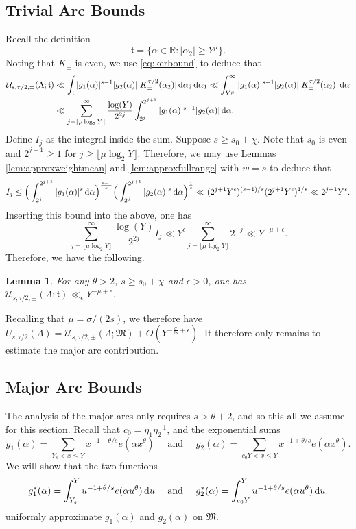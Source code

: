 \documentclass[11pt,reqno]{amsart}
\numberwithin{equation}{section}
\newtheorem{lemma}{Lemma}[section]
\renewcommand{\d}{\,{\rm d}}
\begin{document}
\subsection{Trivial Arc Bounds}
Recall the definition 
\[ \mathfrak{t} = \{ \alpha \in \mathbb{R}: |\alpha_2| \geq Y^{\mu} \} .\] 
Noting that $K_{\pm}$ is even, we use \eqref{eq:kerbound} to deduce that 
\begin{align*} \mathcal{U}_{s,\tau/2,\pm}(\Lambda; \mathfrak{t}) & \ll  \int_{\mathfrak{t}} |g_1(\alpha)|^{s-1}|g_2(\alpha)||K^{\tau/2}_{\pm}(\alpha_2)| \d\alpha_2\d\alpha_1 \ll  \int_{ Y^{\mu}}^{\infty} |g_1(\alpha)|^{s-1}|g_2(\alpha)||K^{\tau/2}_{\pm}(\alpha_2)|\d\alpha 
\\
& \ll \sum_{j = \lfloor{\mu \log_2 Y \rfloor} }^{\infty} \frac{\log(Y)}{2^{2j}}\int_{2^j}^{2^{j+1}} |g_1(\alpha)|^{s-1}|g_2(\alpha)|\d\alpha . 
\end{align*}
Define $I_j$ as the integral inside the sum. Suppose $s \geq s_0 +\chi $. Note that $s_0$ is even and $2^{j+1} \geq 1$ for $j \geq \lfloor \mu \log_2 Y \rfloor$. Therefore, we may use Lemmas \ref{lem:approxweightmean} and \ref{lem:approxfullrange} with $w = s$ to deduce that 
\[ I_j  \leq \Big( \int_{2^j}^{2^{j+1}} |g_1(\alpha)|^{s}\d\alpha \Big)^{\frac{s-1}{s}}\Big( \int_{2^j}^{2^{j+1}} |g_2(\alpha)|^{s}\d\alpha \Big)^{\frac{1}{s}} \ll (2^{j+1}Y^{\epsilon})^{(s-1)/s}(2^{j+1}Y^{\epsilon})^{1/s} \ll 2^{j+1}Y^{\epsilon}. \]
Inserting this bound into the above, one has 
\[ \sum_{j = \lfloor{\mu \log_2 Y \rfloor} }^{\infty} \frac{\log(Y)}{2^{2j}} I_j \ll Y^{\epsilon}\sum_{j=\lfloor{\mu \log_2 Y \rfloor}}^{\infty} 2^{-j} \ll Y^{-\mu+\epsilon}. \]
Therefore, we have the following. 
\begin{lemma} \label{lem:trivial} 
For any $\theta > 2$, $s \geq s_0+\chi$ and $\epsilon > 0$, one has $\mathcal{U}_{s,\tau/2,\pm}(\Lambda; \mathfrak{t}) \ll_{\epsilon} Y^{-\mu+\epsilon}$.
\end{lemma}
Recalling that $\mu = \sigma/(2s)$, we therefore have $U_{s,\tau/2}(\Lambda) = \mathcal{U}_{s,\tau/2,\pm}(\Lambda;\mathfrak{M})+O(Y^{-\frac{\sigma}{2s}+\epsilon})$. It therefore only remains to estimate the major arc contribution. 



\subsection{Major Arc Bounds} The analysis of the major arcs only requires $s > \theta +2$, and so this all we assume for this section. Recall that $c_0 = \eta_1\eta_2^{-1}$, and the exponential sums 
\[ g_1(\alpha) = \sum_{Y_s < x \leq Y} x^{-1+\theta/s}e(\alpha x^{\theta}) \quad \text{ and } \quad g_2(\alpha) = \sum_{c_0 Y < x \leq Y } x^{-1+\theta/s}e(\alpha x^{\theta}). \]
We will show that the two functions 
\[ g^*_1(\alpha) = \int_{Y_s}^Y u^{-1+\theta/s}e(\alpha u^{\theta}) \d u \quad \text{ and } \quad g^*_2(\alpha) = \int_{c_0 Y}^Y u^{-1+\theta/s}e(\alpha u^{\theta}) \d u. \]
uniformly approximate $g_1(\alpha)$ and $g_2(\alpha)$ on $\mathfrak{M}$. 
\end{document}
